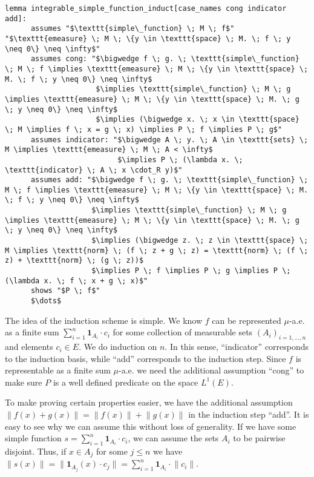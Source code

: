 \begin{isalemma}
{\small
	\begin{lstlisting}[style=isabelle]
	lemma integrable_simple_function_induct[case_names cong indicator add]:
	  assumes "$\texttt{simple\_function} \; M \; f$" "$\texttt{emeasure} \; M \; \{y \in \texttt{space} \; M. \; f \; y \neq 0\} \neq \infty$"
	  assumes cong: "$\bigwedge f \; g. \; \texttt{simple\_function} \; M \; f \implies \texttt{emeasure} \; M \; \{y \in \texttt{space} \; M. \; f \; y \neq 0\} \neq \infty$ 
					 $\implies \texttt{simple\_function} \; M \; g \implies \texttt{emeasure} \; M \; \{y \in \texttt{space} \; M. \; g \; y \neq 0\} \neq \infty$
					 $\implies (\bigwedge x. \; x \in \texttt{space} \; M \implies f \; x = g \; x) \implies P \; f \implies P \; g$"
	  assumes indicator: "$\bigwedge A \; y. \; A \in \texttt{sets} \; M \implies \texttt{emeasure} \; M \; A < \infty$ 
						  $\implies P \; (\lambda x. \; \texttt{indicator} \; A \; x \cdot_R y)$"
	  assumes add: "$\bigwedge f \; g. \; \texttt{simple\_function} \; M \; f \implies \texttt{emeasure} \; M \; \{y \in \texttt{space} \; M. \; f \; y \neq 0\} \neq \infty$
					$\implies \texttt{simple\_function} \; M \; g \implies \texttt{emeasure} \; M \; \{y \in \texttt{space} \; M. \; g \; y \neq 0\} \neq \infty$
					$\implies (\bigwedge z. \; z \in \texttt{space} \; M \implies \texttt{norm} \; (f \; z + g \; z) = \texttt{norm} \; (f \; z) + \texttt{norm} \; (g \; z))$
					$\implies P \; f \implies P \; g \implies P \; (\lambda x. \; f \; x + g \; x)$"
	  shows "$P \; f$"
	  $\dots$
	\end{lstlisting}
}
\end{isalemma}

The idea of the induction scheme is simple. We know $f$ can be represented $\mu$-a.e. as a finite sum $\sum_{i=1}^n \mathbf{1}_{A_i} \cdot c_i$  for some collection of measurable sets $(A_i)_{i=1,\dots,n}$ and elements $c_i \in E$. We do induction on $n$. In this sense, ``indicator'' corresponds to the induction basis, while ``add'' corresponds to the induction step. Since $f$ is representable as a finite sum $\mu$-a.e. we need the additional assumption ``cong'' to make sure $P$ is a well defined predicate on the space $L^1(E)$.

\begin{remark}
To make proving certain properties easier, we have the additional assumption $\lVert f(x) + g(x) \rVert = \lVert f(x) \rVert + \lVert g(x) \rVert$ in the induction step ``add''. It is easy to see why we can assume this without loss of generality. If we have some simple function $s = \sum_{i=1}^n \mathbf{1}_{A_i} \cdot c_i$, we can assume the sets $A_i$ to be pairwise disjoint. Thus, if $x \in A_j$ for some $j \le n$ we have $\lVert s(x) \rVert = \lVert \mathbf{1}_{A_j}(x) \cdot c_j\rVert = \sum_{i=1}^n \mathbf{1}_{A_i} \cdot \lVert c_i \rVert$.
\end{remark}


